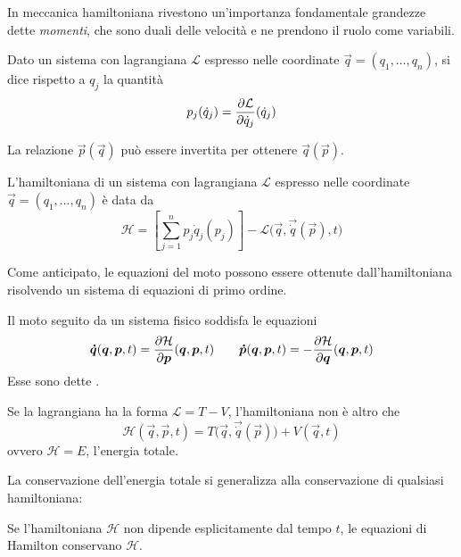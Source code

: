 In meccanica hamiltoniana rivestono un'importanza fondamentale grandezze dette \emph{momenti}, che sono duali delle velocità e ne prendono il ruolo come variabili.
\begin{definition}
  Dato un sistema con lagrangiana $\mathcal{L}$ espresso nelle coordinate $\vec{q}=(q_1, \ldots, q_n)$, si dice  rispetto a $q_j$ la quantità \begin{equation}
  p_j(\dot{q}_j) = \pdv{\mathcal{L}}{\dot{q}_j}() (\dot{q}_j)
  \end{equation} 
\end{definition}
\begin{remark}
  La relazione $\vec{p}(\vec{q})$ può essere invertita per ottenere $\vec{q}(\vec{p})$.
\end{remark}

\begin{theorem}
  L'hamiltoniana di un sistema con lagrangiana $\mathcal{L}$ espresso nelle coordinate $\vec{q}=(q_1, \ldots, q_n)$ è data da \begin{equation*}
  \mathcal{H} = \left[\sum_{j=1}^{n} p_j \dot{q}_j (p_j)\right] - \mathcal{L}\big(\vec{q}, \vec{\dot{q}}(\vec{p}), t\big)
  \end{equation*} 
\end{theorem}

Come anticipato, le equazioni del moto possono essere ottenute dall'hamiltoniana risolvendo un sistema di equazioni di primo ordine.
\begin{theorem}
  Il moto seguito da un sistema fisico soddisfa le equazioni \begin{equation}
  \boldsymbol{\dot{q}}(\boldsymbol{q},\boldsymbol{p},t) = \pdv{\mathcal{H}}{\boldsymbol{p}}()(\boldsymbol{q},\boldsymbol{p},t) \qquad \boldsymbol{\dot{p}}(\boldsymbol{q},\boldsymbol{p},t) = -\pdv{\mathcal{H}}{\boldsymbol{q}}()(\boldsymbol{q},\boldsymbol{p},t)
  \end{equation}
  Esse sono dette .
\end{theorem}

\begin{theorem}
  Se la lagrangiana ha la forma $\mathcal{L} = T - V$, l'hamiltoniana non è altro che \begin{equation*}
  \mathcal{H}(\vec{q},\vec{p},t) = T\big(\vec{q},\vec{\dot{q}}(\vec{p})\big) + V(\vec{q},t)
  \end{equation*} 
  ovvero $\mathcal{H} = E$, l'energia totale.
\end{theorem}

La conservazione dell'energia totale si generalizza alla conservazione di qualsiasi hamiltoniana:
\begin{theorem}
  Se l'hamiltoniana $\mathcal{H}$ non dipende esplicitamente dal tempo $t$, le equazioni di Hamilton conservano $\mathcal{H}$.
\end{theorem}

